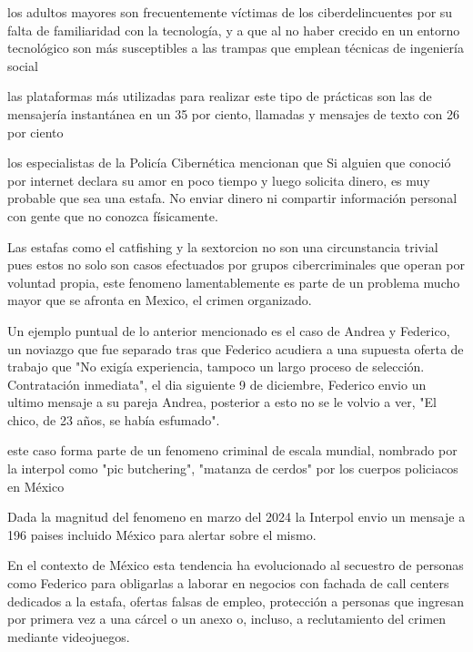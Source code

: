 \documentclass{article}
\begin{document}
los adultos mayores son frecuentemente víctimas de los ciberdelincuentes por su falta de familiaridad con la tecnología, y a que al no haber crecido en un entorno tecnológico son más susceptibles a las trampas que emplean técnicas de ingeniería social

las plataformas más utilizadas para realizar este tipo de prácticas son las de mensajería instantánea en un 35 por ciento, llamadas y mensajes de texto con 26 por ciento

 los especialistas de la Policía Cibernética mencionan que  Si alguien que conoció por internet declara su amor en poco tiempo y luego solicita dinero, es muy probable que sea una estafa. No enviar dinero ni compartir información personal con gente que no conozca físicamente.


\cite{heraldo2025ciberdelitos}

Las estafas como el catfishing y la sextorcion no son una circunstancia trivial pues estos no solo son casos efectuados por grupos cibercriminales que operan por voluntad propia, este fenomeno lamentablemente es parte de un problema mucho mayor que se afronta en Mexico,  el crimen organizado.

Un ejemplo puntual de lo anterior mencionado es el caso de Andrea y Federico, un noviazgo que fue separado tras que Federico acudiera a una supuesta oferta de trabajo que "No exigía experiencia, tampoco un largo proceso de selección. Contratación inmediata", el dia siguiente 9 de diciembre, Federico envio un ultimo mensaje a su pareja Andrea, posterior a esto no se le volvio a ver, "El chico, de 23 años, se había esfumado".

este caso forma parte de un fenomeno criminal de escala mundial, nombrado por la interpol como "pic butchering", "matanza de cerdos" por los cuerpos policiacos en México

Dada la magnitud del fenomeno en marzo del 2024 la Interpol envio un mensaje a 196 paises incluido México para alertar sobre el mismo.

En el contexto de México esta tendencia ha evolucionado al secuestro de personas como Federico para obligarlas a laborar en negocios con fachada de call centers dedicados a la estafa, ofertas falsas de empleo, protección a personas que ingresan por primera vez a una cárcel o un anexo o, incluso, a reclutamiento del crimen mediante videojuegos.
\end{document}
